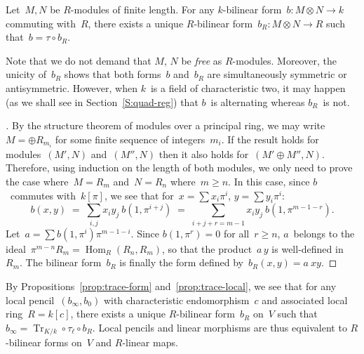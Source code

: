 \documentclass{article}%
\def\transpose#1{{\vphantom{#1}}^{\mathrm{t}}\!#1}
\DeclareMathOperator\Hom{Hom}
\DeclareMathOperator\Tr{Tr}
\begin{document}
\begin{prop}\label{prop:trace-local}%
Let~$M, N$ be $R$-modules of finite length.
For any $k$-bilinear form~$b: M ⊗ N → k$ commuting with~$R$,
there exists a unique $R$-bilinear form~$b_R: M ⊗ N → R$ such that~$b = τ
∘ b_R$.
\end{prop}

Note that we do not demand that $M$, $N$ be \emph{free} as $R$-modules.
Moreover, the unicity of~$b_R$ shows that both forms~$b$ and~$b_R$ are
simultaneously symmetric or antisymmetric.
However, when $k$~is a field of characteristic two, it may happen (as we
shall see in Section~\ref{S:quad-reg}) that $b$~is alternating whereas
$b_R$~is not.

\begin{proof}[]
By the structure theorem of modules over a principal ring, we may
write~$M = ⊕ R_{m_i}$ for some finite sequence of integers~$m_i$. If the
result holds for modules~$(M', N)$ and~$(M'', N)$ then it also holds
for~$(M' ⊕ M'', N)$. Therefore, using induction on the length of both
modules, we only need to prove the case where~$M = R_m$ and~$N = R_n$
where~$m ≥ n$. In this case, since $b$~commutes with~$k[π]$, we see that
for~$x = ∑ x_i π^i$, $y = ∑ y_i π^i$:
\begin{equation}
b(x,y) \;=\; ∑_{i,j} x_i y_j\: b(1, π^{i+j})
  \;=\; ∑_{i+j+r = m-1} x_i y_j\: b(1, π^{m-1-r}).
\end{equation}
Let~$a = ∑ b(1, π^{i}) π^{m-1-i}$. Since $b(1, π^{r}) = 0$ for all~$r ≥
n$, $a$~belongs to the ideal~$π^{m-n} R_m = \Hom_R (R_n, R_m)$, so that
the product~$a\,y$ is well-defined in~$R_m$. The bilinear form~$b_R$ is
finally the form defined by~$b_R(x,y) = a\:x y$.
\end{proof}%

By Propositions~\ref{prop:trace-form} and~\ref{prop:trace-local},
we see that for any local pencil~$(b_{∞}, b_0)$
with characteristic endomorphism~$c$
and associated local ring~$R = k[c]$,
there exists a unique $R$-bilinear form~$b_R$ on~$V$
such that~$b_{∞} = \Tr_{K/k} ∘ τ_ℓ ∘ b_R$.
Local pencils and linear morphisms are thus equivalent
to $R$-bilinear forms on~$V$ and $R$-linear maps.
\end{document}
